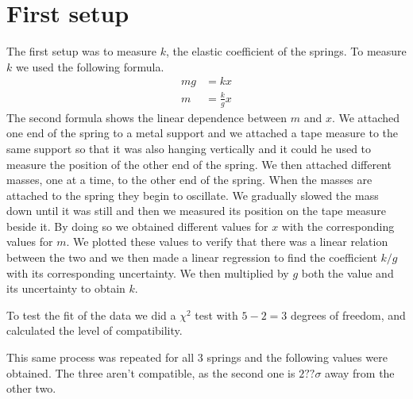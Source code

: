 \documentclass{article}
\begin{document}
\section{First setup} \label{sec:setup1}
The first setup was to measure $k$, the elastic coefficient of the springs. 
To measure $k$ we used the following formula.
\begin{align}
    mg &= kx \\
    m  &= \frac{k}{g}x
\end{align}
The second formula shows the linear dependence between $m$ and $x$.
We attached one end of the spring to a metal support and we attached a
tape measure to the same support so that it was also hanging
vertically and it could he used to measure the position of the other
end of the spring. We then attached different masses, one at a time, to the other 
end of the spring. When the masses are attached to the spring they
begin to oscillate. We gradually slowed the mass down until it was
still and then we measured its position on the tape measure beside
it. By doing so we obtained different values for $x$ with the
corresponding values for $m$. We plotted these values to verify that
there was a linear relation between the two and we then made a linear
regression to find the coefficient $k/g$ with its corresponding
uncertainty. We then multiplied by $g$ both the value and its uncertainty to obtain $k$. 

To test the fit of the data we did a $\chi^2$ test with $5-2 = 3$ degrees of freedom, and calculated the level of compatibility.

This same process was repeated for all 3 springs and the following values were obtained.
The three aren't compatible, as the second one is $2?? \sigma$ away from the other two. 


\end{document}

